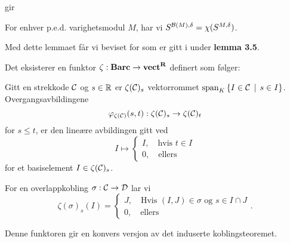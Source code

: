 \citep[Lemma 3.5]{Bauer2020} gir

\begin{lemma}\label{lem:Lem3.5}
  For enhver p.e.d. varighetsmodul $M$, har vi
  $S^{\mathcal{B}(M),\delta} = \chi(S^{M,\delta})$.
\end{lemma}

Med dette lemmaet får vi beviset for
 som er gitt i \citep{Bauer2020}
under \textbf{lemma 3.5}.

\begin{definisjon}\label{def:zetafunktor}
  Det eksisterer en funktor $\zeta:\textnormal{\textbf{Barc}}\to\textnormal{\textbf{vect}}^{\textnormal{\textbf{{R}}}}$
  definert som følger:

  Gitt en strekkode $\mathcal{C}$ og $s\in\mathbb{R}$ er $\zeta(\mathcal{C})_s$
  vektorrommet $\text{span}_K\left\{I\in\mathcal{C}\,\mid\,s\in I\right\}$.
  Overgangsavbildingene
  \[\varphi_{\zeta(\mathcal{C})}(s,t):\zeta(\mathcal{C})_s\to\zeta(\mathcal{C})_t\]
  for $s\leq t$, er den lineære avbildingen gitt ved
  \[I \mapsto 
  \begin{cases}
    I,\quad \text{hvis $t\in I$}\\
    0,\quad \text{ellers}
  \end{cases}
  \]
  for et basiselement $I\in\zeta(\mathcal{C})_s$.

  For en overlappkobling $\sigma:\mathcal{C}\to\mathcal{D}$ lar vi
  \[\zeta(\sigma)_s(I) =
  \begin{cases}
    J,\quad \text{Hvis $(I,J)\in\sigma$ og $s\in I\cap
    J$}\\
    0,\quad\text{ellers}
  \end{cases}.\]
\end{definisjon}
Denne funktoren gir en konvers versjon av det induserte
koblingsteoremet.

